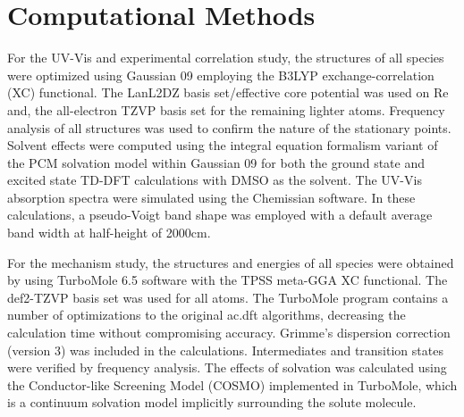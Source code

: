 \section{Computational Methods} \label{sec.compmethods}
For the UV-Vis and experimental correlation study, the structures of all species were optimized using Gaussian 09\autocite{gaussian} employing the B3LYP\autocite{becke1993, lee1988}  exchange-correlation (XC) functional. The LanL2DZ basis set/effective core potential\autocite{hay1985} was used on Re and, the all-electron TZVP basis set\autocite{schaefer1994} for the remaining lighter atoms. Frequency analysis of all structures was used to confirm the nature of the stationary points. Solvent effects were computed using the integral equation formalism variant of the PCM solvation model within Gaussian 09 for both the ground state and excited state TD-DFT calculations with DMSO as the solvent\autocite{tomasi2005, scalmani2006}. The UV-Vis absorption spectra were simulated using the Chemissian software\autocite{chemissian}. In these calculations, a pseudo-Voigt band shape was employed with a default average band width at half-height of 2000cm.

For the mechanism study, the structures and energies of all species were obtained by using TurboMole  6.5 software\autocite{turbomole, ahlrichs1989} with the TPSS meta-GGA XC functional\autocite{tao2003}. The def2-TZVP basis set was used for all atoms\autocite{schafer1994, weigend2005}. The TurboMole program contains a number of optimizations to the original \gls{ac.dft} algorithms\autocite{haase1993, treutler1995, eichkorn1997, eichkorn1995, sierka2003, deglmann2004, weigend2002, vonarnim1998, ahlrichs2004}, decreasing the calculation time without compromising accuracy. Grimme's dispersion correction (version 3) was included in the calculations\autocite{grimme2010}. Intermediates and transition states were verified by frequency analysis\autocite{dieglmann 2004, deglmann2002, grimme2002}. The effects of solvation was calculated using the Conductor-like Screening Model (COSMO) implemented in TurboMole\autocite{klamt1993}, which is a continuum solvation model implicitly surrounding the solute molecule.

